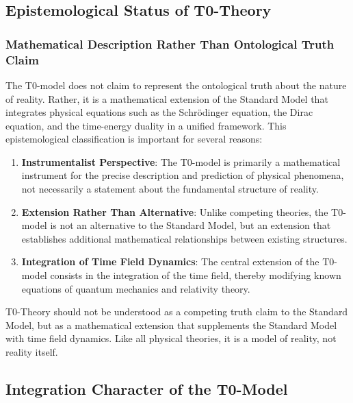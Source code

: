 \documentclass[12pt,a4paper]{article}
\theoremstyle{definition}
\begin{document}
	\subsection{Epistemological Status of T0-Theory}
	
	\subsubsection{Mathematical Description Rather Than Ontological Truth Claim}
	
	The T0-model does not claim to represent the ontological truth about the nature of reality. Rather, it is a mathematical extension of the Standard Model that integrates physical equations such as the Schrödinger equation, the Dirac equation, and the time-energy duality in a unified framework. This epistemological classification is important for several reasons:
	
	\begin{enumerate}
		\item \textbf{Instrumentalist Perspective}: The T0-model is primarily a mathematical instrument for the precise description and prediction of physical phenomena, not necessarily a statement about the fundamental structure of reality.
		
		\item \textbf{Extension Rather Than Alternative}: Unlike competing theories, the T0-model is not an alternative to the Standard Model, but an extension that establishes additional mathematical relationships between existing structures.
		
		\item \textbf{Integration of Time Field Dynamics}: The central extension of the T0-model consists in the integration of the time field, thereby modifying known equations of quantum mechanics and relativity theory.
	\end{enumerate}
	
	\begin{wichtig}
		T0-Theory should not be understood as a competing truth claim to the Standard Model, but as a mathematical extension that supplements the Standard Model with time field dynamics. Like all physical theories, it is a model of reality, not reality itself.
	\end{wichtig}
	
	\subsection{Integration Character of the T0-Model}
	
\end{document}
